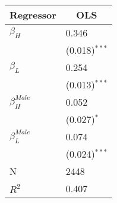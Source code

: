 %
\begin{tabular*}{3in}{@{\extracolsep{\fill}}ll}\hline\hline
\multicolumn{1}{l}{Regressor}&\multicolumn{1}{c}{OLS}\tabularnewline
\hline
$\beta_H$&0.346\tabularnewline
&{\scriptsize (0.018)$^{***}$}\tabularnewline
$\beta_L$&0.254\tabularnewline
&{\scriptsize (0.013)$^{***}$}\tabularnewline
$\beta_H^{Male}$&0.052\tabularnewline
&{\scriptsize (0.027)$^{*}$}\tabularnewline
$\beta_L^{Male}$&0.074\tabularnewline
&{\scriptsize (0.024)$^{***}$}\tabularnewline
N&2448\tabularnewline
$R^2$&0.407\tabularnewline
\hline
\end{tabular*}

